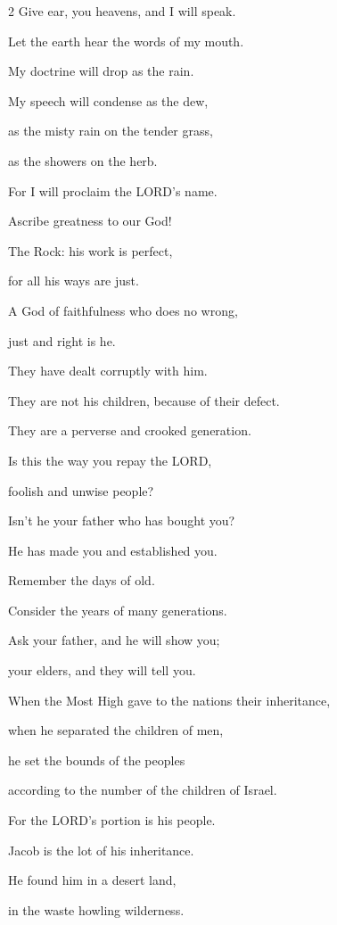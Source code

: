 \mychapter{}
\begin{multicols}{2}
 \myverse*{}Give ear, you heavens, and I will speak.

Let the earth hear the words of my mouth.

\myverse{}My doctrine will drop as the rain.

My speech will condense as the dew,

as the misty rain on the tender grass,

as the showers on the herb.

\myverse{}For I will proclaim the LORD’s name.

Ascribe greatness to our God!

\myverse{}The Rock: his work is perfect,

for all his ways are just.

A God of faithfulness who does no wrong,

just and right is he.

\myverse{}They have dealt corruptly with him.

They are not his children, because of their defect.

They are a perverse and crooked generation.

\myverse{}Is this the way you repay the LORD,

foolish and unwise people?

Isn’t he your father who has bought you?

He has made you and established you.

\myverse{}Remember the days of old.

Consider the years of many generations.

Ask your father, and he will show you;

your elders, and they will tell you.

\myverse{}When the Most High gave to the nations their inheritance,

when he separated the children of men,

he set the bounds of the peoples

according to the number of the children of Israel.

\myverse{}For the LORD’s portion is his people.

Jacob is the lot of his inheritance.

\myverse{}He found him in a desert land,

in the waste howling wilderness.


\end{multicols}
